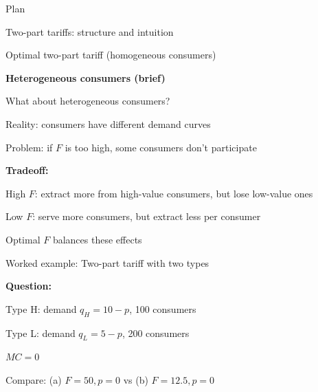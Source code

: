 \documentclass[notes,11pt, aspectratio=169]{beamer}
\newenvironment{wideitemize}{\itemize\addtolength{\itemsep}{10pt}}{\enditemize}
\newenvironment{wideenumerate}{\enumerate\addtolength{\itemsep}{10pt}}{\endenumerate}
\begin{document}
\begin{frame}{Plan}
  \begin{wideenumerate}
    \item Two-part tariffs: structure and intuition
    \item Optimal two-part tariff (homogeneous consumers)
    \item \textbf{Heterogeneous consumers (brief)}
  \end{wideenumerate}
\end{frame}

\begin{frame}{What about heterogeneous consumers?}
	\begin{wideitemize}
		\item Reality: consumers have different demand curves
		\item Problem: if $F$ is too high, some consumers don't participate
		\item \textbf{Tradeoff:}
		\begin{wideitemize}
			\vspace{5pt}
			\item High $F$: extract more from high-value consumers, but lose low-value ones
			\item Low $F$: serve more consumers, but extract less per consumer
		\end{wideitemize}
		\item Optimal $F$ balances these effects
	\end{wideitemize}
\end{frame}

\begin{frame}{Worked example: Two-part tariff with two types}
	\begin{wideitemize}
		\item \textbf{Question:}
		\item Type H: demand $q_H = 10 - p$, 100 consumers
		\item Type L: demand $q_L = 5 - p$, 200 consumers
		\item $MC = 0$
		\item Compare: (a) $F = 50, p = 0$ vs (b) $F = 12.5, p = 0$
	\end{wideitemize}
\end{frame}
\end{document}
